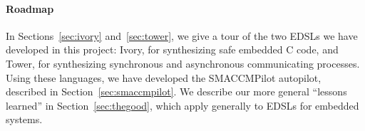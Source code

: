 
\paragraph{Roadmap}
In Sections~\ref{sec:ivory} and~\ref{sec:tower}, we give a tour of the two EDSLs
we have developed in this project: Ivory, for synthesizing safe embedded C code,
and Tower, for synthesizing synchronous and asynchronous communicating
processes.  Using these languages, we have developed the SMACCMPilot autopilot,
described in Section~\ref{sec:smaccmpilot}.  We describe our more general
``lessons learned'' in Section~\ref{sec:thegood}, which apply generally to EDSLs
for embedded systems.
